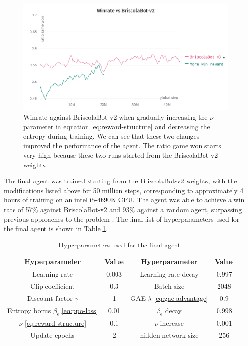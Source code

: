 \begin{figure}[H]
    \centering
    \includegraphics[width=\textwidth]{images/briscolabot-v3.png}
    \caption{Winrate against BriscolaBot-v2 when gradually increasing the $\nu$ parameter in equation \eqref{eq:reward-structure} and decreasing the entropy during training. We can see that these two changes improved the performance of the agent. The ratio game won starts very high because these two runs started from the BriscolaBot-v2 weights.}
    \label{fig:briscolabot-v3}
\end{figure}

The final agent was trained starting from the BriscolaBot-v2 weights, with the modifications listed above for 50 million steps, corresponding to approximately 4 hours of training on an intel i5-4690K CPU. The agent was able to achieve a win rate of 57\% against BriscolaBot-v2 and 93\% against a random agent, surpassing previous approaches to the problem \cite{alsora-deep-briscola-dqn}. The final list of hyperparameters used for the final agent is shown in Table \ref{tab:hyperparam-final}.

\begin{table}[H]
    \centering
    \begin{tabular}{cccc}
        \hline
        Hyperparameter & Value & Hyperparameter & Value \\
        \hline
        Learning rate & 0.003 & Learning rate decay & 0.997 \\
        Clip coefficient & 0.3 & Batch size & 2048 \\
        Discount factor $\gamma$ & 1 & GAE $\lambda$ \eqref{eq:gae-advantage} & 0.9 \\
        Entropy bonus $\beta_\textrm{e}$ \eqref{eq:ppo-loss} & 0.01 & $\beta_\textrm{e}$ decay & 0.998 \\
        $\nu$ \eqref{eq:reward-structure} & 0.1 & $\nu$ increase & 0.001 \\
        Update epochs & 2 & hidden network size & 256
    \end{tabular}
    \caption{Hyperparameters used for the final agent.}
    \label{tab:hyperparam-final}
\end{table}

